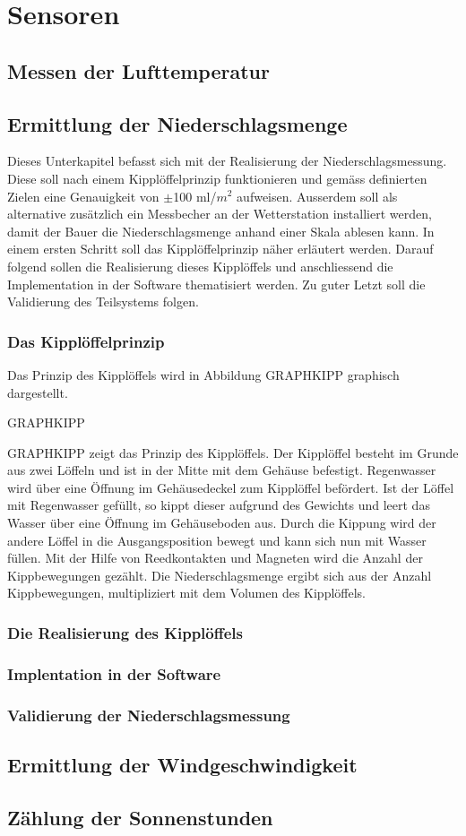 \section{Sensoren}


\subsection{Messen der Lufttemperatur}
\subsection{Ermittlung der Niederschlagsmenge}
Dieses Unterkapitel befasst sich mit der Realisierung der Niederschlagsmessung. Diese soll nach einem Kipplöffelprinzip funktionieren und gemäss definierten Zielen eine Genauigkeit von $\pm$100 ml/$m^2$ aufweisen. Ausserdem soll als alternative zusätzlich ein Messbecher an der Wetterstation installiert werden, damit der Bauer die Niederschlagsmenge anhand einer Skala ablesen kann. In einem ersten Schritt soll das Kipplöffelprinzip näher erläutert werden. Darauf folgend sollen die Realisierung dieses Kipplöffels und anschliessend die Implementation in der Software thematisiert werden. Zu guter Letzt soll die Validierung des Teilsystems folgen.
\subsubsection*{Das Kipplöffelprinzip}
Das Prinzip des Kipplöffels wird in Abbildung GRAPHKIPP graphisch dargestellt.

GRAPHKIPP

GRAPHKIPP zeigt das Prinzip des Kipplöffels. Der Kipplöffel besteht im Grunde aus zwei Löffeln und ist in der Mitte mit dem Gehäuse befestigt. Regenwasser wird über eine Öffnung im Gehäusedeckel zum Kipplöffel befördert. Ist der Löffel mit Regenwasser gefüllt, so kippt dieser aufgrund des Gewichts und leert das Wasser über eine Öffnung im Gehäuseboden aus. Durch die Kippung wird der andere Löffel in die Ausgangsposition bewegt und kann sich nun mit Wasser füllen. Mit der Hilfe von Reedkontakten und Magneten wird die Anzahl der Kippbewegungen gezählt. Die Niederschlagsmenge ergibt sich aus der Anzahl Kippbewegungen, multipliziert mit dem Volumen des Kipplöffels.
\subsubsection*{Die Realisierung des Kipplöffels}

\subsubsection*{Implentation in der Software}
\subsubsection*{Validierung der Niederschlagsmessung}
 
\subsection{Ermittlung der Windgeschwindigkeit}
\subsection{Zählung der Sonnenstunden}
